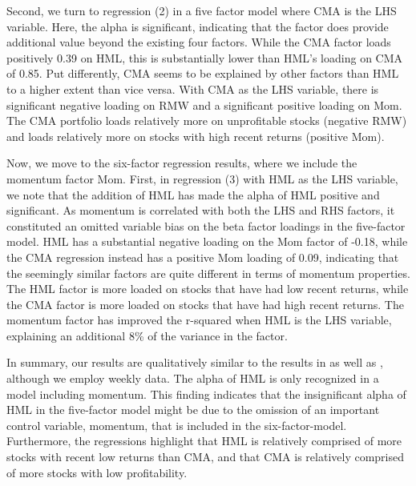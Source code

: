 Second, we turn to regression (2) in a five factor model where CMA is the LHS variable. Here, the alpha is significant, indicating that the factor does provide additional value beyond the existing four factors. While the CMA factor loads positively 0.39 on HML, this is substantially lower than HML's loading on CMA of 0.85. Put differently, CMA seems to be explained by other factors than HML to a higher extent than vice versa. With CMA as the LHS variable, there is significant negative loading on RMW and a significant positive loading on Mom. The CMA portfolio loads relatively more on unprofitable stocks (negative RMW) and loads relatively more on stocks with high recent returns (positive Mom).

Now, we move to the six-factor regression results, where we include the momentum factor Mom. First, in regression (3) with HML as the LHS variable, we note that the addition of HML has made the alpha of HML positive and significant. As momentum is correlated with both the LHS and RHS factors, it constituted an omitted variable bias on the beta factor loadings in the five-factor model. HML has a substantial negative loading on the Mom factor of -0.18, while the CMA regression instead has a positive Mom loading of 0.09, indicating that the seemingly similar factors are quite different in terms of momentum properties. The HML factor is more loaded on stocks that have had low recent returns, while the CMA factor is more loaded on stocks that have had high recent returns. The momentum factor has improved the r-squared when HML is the LHS variable, explaining an additional 8\% of the variance in the factor.

In summary, our results are qualitatively similar to the results in \textcite{FF2015} as well as \textcite{Asness2015}, although we employ weekly data. The alpha of HML is only recognized in a model including momentum. This finding indicates that the insignificant alpha of HML in the five-factor model might be due to the omission of an important control variable, momentum, that is included in the six-factor-model. Furthermore, the regressions highlight that HML is relatively comprised of more stocks with recent low returns than CMA, and that CMA is relatively comprised of more stocks with low profitability.

